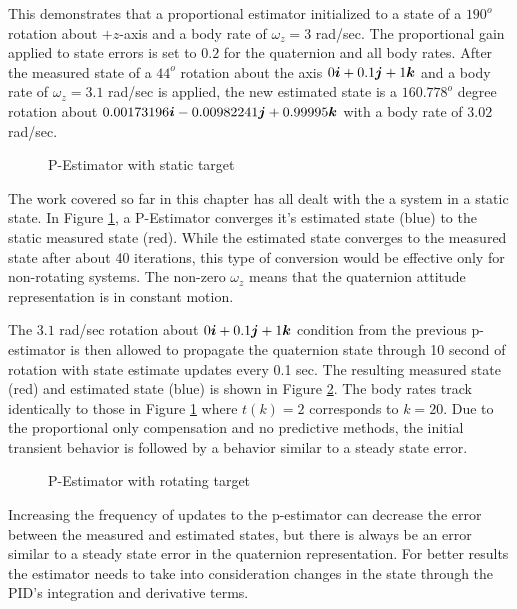 This demonstrates that a proportional estimator initialized to a state of a $190^o$ rotation about $+z$-axis and a body rate of $\omega_z = 3$ rad/sec.  The proportional gain applied to state errors is set to $0.2$ for the quaternion and all body rates.  After the measured state of a $44^o$ rotation about the axis $0 \boldsymbol{i} + 0.1 \boldsymbol{j} + 1\boldsymbol{k}$ and a body rate of $\omega_z = 3.1$ rad/sec is applied, the new estimated state is a $160.778^o$ degree rotation about $0.00173196 \boldsymbol{i} - 0.00982241 \boldsymbol{j} + 0.99995\boldsymbol{k}$ with a body rate of $3.02$ rad/sec.

\begin{figure}[H]
  \centerline{}
  \caption{P-Estimator with static target}
  \label{fig:PEstimatorwithstatictarget}
\end{figure}

The work covered so far in this chapter has all dealt with the a system in a static state.  In Figure \ref{fig:PEstimatorwithstatictarget}, a P-Estimator converges it's estimated state (blue) to the static measured state (red).  While the estimated state converges to the measured state after about 40 iterations, this type of conversion would be effective only for non-rotating systems.  The non-zero $\omega_z$ means that the quaternion attitude representation is in constant motion.

The $3.1$ rad/sec rotation about $0\boldsymbol{i} + 0.1\boldsymbol{j} + 1\boldsymbol{k}$ condition from the previous p-estimator is then allowed to propagate the quaternion state through 10 second of rotation with state estimate updates every 0.1 sec.  The resulting measured state (red) and estimated state (blue) is shown in Figure \ref{fig:PEstimatorwithrotatingtarget}.  The body rates track identically to those in Figure \ref{fig:PEstimatorwithstatictarget} where $t(k) = 2$ corresponds to $k = 20$.  Due to the proportional only compensation and no predictive methods, the initial transient behavior is followed by a behavior similar to a steady state error.

\begin{figure}[H]
  \centerline{}
  \caption{P-Estimator with rotating target}
  \label{fig:PEstimatorwithrotatingtarget}
\end{figure}

Increasing the frequency of updates to the p-estimator can decrease the error between the measured and estimated states, but there is always be an error similar to a steady state error in the quaternion representation.  For better results the estimator needs to take into consideration changes in the state through the PID's integration and derivative terms.

